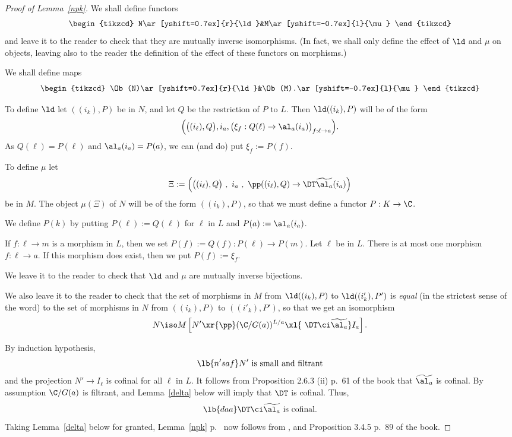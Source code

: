 \documentclass[12pt]{article}
\theoremstyle{remark}
\theoremstyle{definition}
\begin{document}
\begin{proof}[Proof of Lemma~\ref{npk}]
We shall define functors 
$$
\begin{tikzcd}
N\ar[yshift=0.7ex]{r}{\ld}&M\ar[yshift=-0.7ex]{l}{\mu}
\end{tikzcd}
$$ 
and leave it to the reader to check that they are mutually inverse isomorphisms. (In fact, we shall only define the effect of $\ld$ and $\mu$ on objects, leaving also to the reader the definition of the effect of these functors on morphisms.)

We shall define maps 
$$
\begin{tikzcd}
\Ob(N)\ar[yshift=0.7ex]{r}{\ld}&\Ob(M).\ar[yshift=-0.7ex]{l}{\mu}
\end{tikzcd}
$$ 

To define $\ld$ let $((i_k),P)$ be in $N$, and let $Q$ be the restriction of $P$ to $L$. Then $\ld((i_k),P)$ will be of the form 
$$
\Big(\big((i_\ell),Q\big),i_a,\big(\xi_f:Q(\ell)\to\al_a(i_a)\big)_{f:\ell\to a}\Big).
$$ 
As $Q(\ell)=P(\ell)$ and $\al_a(i_a)=P(a)$, we can (and do) put $\xi_f:=P(f)$. 

To define $\mu$ let 
$$
\Xi:=\Big(\big((i_\ell),Q\big)\ ,\ i_a\ ,\ \pp((i_\ell),Q)\to\DT\widetilde{\al_a}(i_a)\Big)
$$ 
be in $M$. The object $\mu(\Xi)$ of $N$ will be of the form $((i_k),P)$, so that we must define a functor $P:K\to\C$. 

We define $P(k)$ by putting $P(\ell):=Q(\ell)$ for $\ell$ in $L$ and $P(a):=\al_a(i_a)$. 

If $f:\ell\to m$ is a morphism in $L$, then we set $P(f):=Q(f):P(\ell)\to P(m)$. Let $\ell$ be in $L$. There is at most one morphism $f:\ell\to a$. If this morphism does exist, then we put $P(f):=\xi_f$. 

We leave it to the reader to check that $\ld$ and $\mu$ are mutually inverse bijections. 

We also leave it to the reader to check that the set of morphisms in $M$ from $\ld((i_k),P)$ to $\ld((i'_k),P')$ is \emph{equal} (in the strictest sense of the word) to the set of morphisms in $N$ from $((i_k),P)$ to $((i'_k),P')$, so that we get an isomorphism 
$$ 
N\iso M\left[N'\xr{\pp}(\C/G(a))^{L/a}\xl{\ \DT\ci\widetilde{\al_a}}I_a\right]. 
$$

By induction hypothesis, 
\begin{equation}\lb{n'saf}
N'\text{ is small and filtrant}
\end{equation} 
and the projection $N'\to I_\ell$ is cofinal for all $\ell$ in $L$. It follows from Proposition 2.6.3 (ii) p.~61 of the book that $\widetilde{\al_a}$ is cofinal. By assumption $\C/G(a)$ is filtrant, and Lemma~\ref{delta} below will imply that $\DT$ is cofinal. Thus, 
\begin{equation}\lb{daa}
\DT\ci\widetilde{\al_a}\text{ is cofinal.}
\end{equation} 
Taking Lemma~\ref{delta} below for granted, Lemma~\ref{npk} p.~ now follows from ,  and Proposition 3.4.5 p.~89 of the book. 
\end{proof} 
\end{document}
